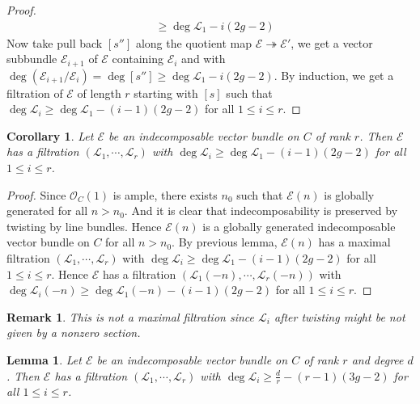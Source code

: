 \documentclass{ctexart}
\newtheorem{remark}{Remark}[section]
\newtheorem{lemma}{Lemma}[section]
\newtheorem{corollary}{Corollary}[section]
\begin{document}
\begin{proof}
\begin{equation}
\begin{split}
            & \ge \deg \mathcal{L}_{1} - i(2g - 2)
        \end{split}
    \end{equation}
    Now take pull back $[s'']$ along the quotient map $\mathcal{E} \twoheadrightarrow \mathcal{E}'$, we get a vector subbundle $\mathcal{E}_{i + 1}$ of $\mathcal{E}$ containing $\mathcal{E}_{i}$ and with $\deg (\mathcal{E}_{i + 1}/\mathcal{E}_{i}) = \deg [s''] \ge \deg \mathcal{L}_{1} - i(2g - 2)$.
    By induction, we get a filtration of $\mathcal{E}$ of length $r$ starting with $[s]$ such that $\deg \mathcal{L}_{i} \ge \deg \mathcal{L}_{1} - (i - 1)(2g - 2)$ for all $1 \le i \le r$.
\end{proof}
\begin{corollary}
    Let $\mathcal{E}$ be an indecomposable vector bundle on $C$ of rank $r$.
    Then $\mathcal{E}$ has a filtration $(\mathcal{L}_{1}, \cdots, \mathcal{L}_{r})$ with $\deg \mathcal{L}_{i} \ge \deg \mathcal{L}_{1} - (i - 1)(2g - 2)$ for all $1 \le i \le r$.
    \label{Corollary 5.4}
\end{corollary}
\begin{proof}
    Since $\mathcal{O}_{C}(1)$ is ample, there exists $n_{0}$ such that $\mathcal{E}(n)$ is globally generated for all $n > n_{0}$.
    And it is clear that indecomposability is preserved by twisting by line bundles.
    Hence $\mathcal{E}(n)$ is a globally generated indecomposable vector bundle on $C$ for all $n > n_{0}$.
    By previous lemma, $\mathcal{E}(n)$ has a maximal filtration $(\mathcal{L}_{1}, \cdots, \mathcal{L}_{r})$ with $\deg \mathcal{L}_{i} \ge \deg \mathcal{L}_{1} - (i - 1)(2g - 2)$ for all $1 \le i \le r$.
    Hence $\mathcal{E}$ has a filtration $(\mathcal{L}_{1}(-n), \cdots, \mathcal{L}_{r}(-n))$ with $\deg \mathcal{L}_{i}(-n) \ge \deg \mathcal{L}_{1}(-n) - (i - 1)(2g - 2)$ for all $1 \le i \le r$.
\end{proof}
\begin{remark}
    This is not a maximal filtration since $\mathcal{L}_{i}$ after twisting might be not given by a nonzero section.
\end{remark}
\begin{lemma}
    Let $\mathcal{E}$ be an indecomposable vector bundle on $C$ of rank $r$ and degree $d$.
    Then $\mathcal{E}$ has a filtration $(\mathcal{L}_{1}, \cdots, \mathcal{L}_{r})$ with $\deg \mathcal{L}_{i} \ge \frac{d}{r} - (r - 1)(3g - 2)$ for all $1 \le i \le r$.
    \label{Lemma 5.7}
\end{lemma}
\end{document}
